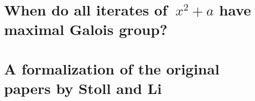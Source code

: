 \part{\texorpdfstring{When do all iterates of~$x^2 + a$ have maximal Galois group?}{When do all
  iterates of x² + a have maximal Galois group?}}
\label{part:arboreal}








\appendix




\part{A formalization of the original papers by Stoll and Li}
\label{part:original}
\secondpart








